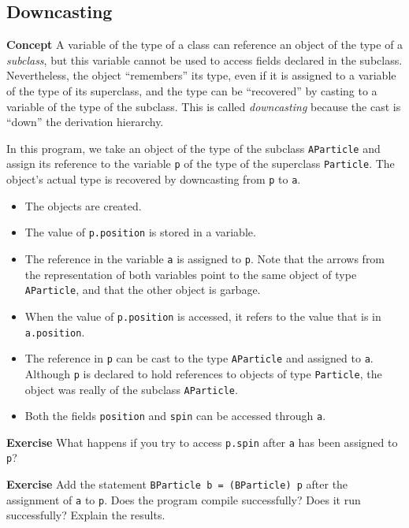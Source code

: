 \subsection{Downcasting}\label{inher.04}

\textbf{Concept} A variable of the type of a class can reference an object 
of the type of a \emph{subclass}, but this variable cannot be used to access fields 
declared in the subclass.
Nevertheless, the object ``remembers'' its type, even if it is assigned 
to a variable of the type of its superclass, and the type can be ``recovered''
by casting to a variable of the type of the subclass. 
This is called 
\emph{downcasting} because the cast is ``down'' the derivation hierarchy.


In this program, we take an object of the type of the 
subclass \texttt{AParticle} and assign its reference to the variable 
\texttt{p} of the type of the superclass \texttt{Particle}. The object's 
actual type is recovered by downcasting from \texttt{p} to \texttt{a}.
\begin{itemize}
  \item The objects are created.
  \item The value of \texttt{p.position} is stored in a variable.
  \item The reference in the variable \texttt{a} is assigned to \texttt{p}.
  Note that the arrows from the representation of both variables point to
  the same object of type \texttt{AParticle}, and that the other object
  is garbage.
  \item When the value of \texttt{p.position} is accessed, it refers to the value that 
  is in \texttt{a.position}.
  \item The reference in \texttt{p} can be cast to the type \texttt{AParticle}
  and assigned to \texttt{a}. Although \texttt{p} is declared to hold references to objects of
  type \texttt{Particle}, the object was really of the   subclass \texttt{AParticle}.
  \item Both the fields \texttt{position} and \texttt{spin} can be accessed 
  through \texttt{a}.
\end{itemize}

\textbf{Exercise} What happens if you try to access \texttt{p.spin} after
\texttt{a} has been assigned to \texttt{p}?

\textbf{Exercise} Add the statement \texttt{BParticle b = (BParticle) p}
after the assignment of \texttt{a} to \texttt{p}. Does the program compile
successfully? Does it run successfully? Explain the results.
